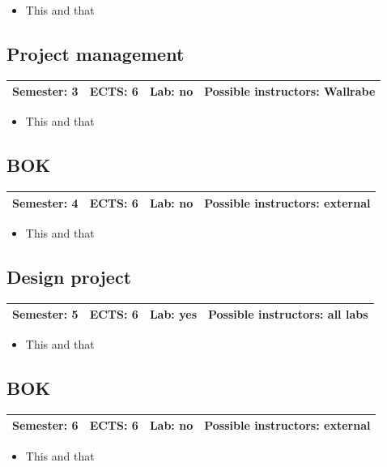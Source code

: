 \documentclass[12pt,twoside,fleqn,a4paper]{article}
\begin{document}
\begin{itemize}
\setlength\itemsep{0cm}
\item This and that
\end{itemize}


\subsection{Project management}
\begin{tabular}{llll} \hline
\textbf{Semester:} 3 & \textbf{ECTS:} 6 & \textbf{Lab:} no & \textbf{Possible instructors:} Wallrabe\\
\hline
\end{tabular}

\begin{itemize}
\setlength\itemsep{0cm}
\item This and that
\end{itemize}


\subsection{BOK}
\begin{tabular}{llll} \hline
\textbf{Semester:} 4 & \textbf{ECTS:} 6 & \textbf{Lab:} no & \textbf{Possible instructors:} external\\
\hline
\end{tabular}

\begin{itemize}
\setlength\itemsep{0cm}
\item This and that
\end{itemize}


\subsection{Design project}
\begin{tabular}{llll} \hline
\textbf{Semester:} 5 & \textbf{ECTS:} 6 & \textbf{Lab:} yes & \textbf{Possible instructors:} all labs\\
\hline
\end{tabular}

\begin{itemize}
\setlength\itemsep{0cm}
\item This and that
\end{itemize}


\subsection{BOK}
\begin{tabular}{llll} \hline
\textbf{Semester:} 6 & \textbf{ECTS:} 6 & \textbf{Lab:} no & \textbf{Possible instructors:} external\\
\hline
\end{tabular}

\begin{itemize}
\setlength\itemsep{0cm}
\item This and that
\end{itemize}
\end{document}
